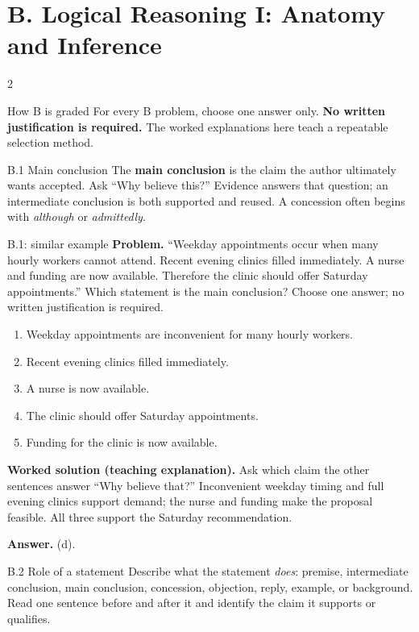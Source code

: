 \documentclass[10pt]{extarticle}
\newcommand{\term}[1]{\textbf{\color{ArgNavy}#1}}
\begin{document}
\section*{B. Logical Reasoning I: Anatomy and Inference}
\begin{multicols}{2}
\begin{definitionbox}{How B is graded}
For every B problem, choose one answer only. \textbf{No written justification is
required.} The worked explanations here teach a repeatable selection method.
\end{definitionbox}

\begin{methodbox}{B.1 Main conclusion}
The \term{main conclusion} is the claim the author ultimately wants accepted.
Ask ``Why believe this?'' Evidence answers that question; an intermediate
conclusion is both supported and reused. A concession often begins with
\emph{although} or \emph{admittedly}.
\end{methodbox}

\begin{workedbox}{B.1: similar example}
\textbf{Problem.} ``Weekday appointments occur when many hourly workers cannot attend. Recent evening clinics filled immediately. A nurse and funding are now available. Therefore the clinic should offer Saturday appointments.'' Which statement is the main conclusion? Choose one answer; no written justification is required.

\begin{enumerate}[label=(\alph*)]
\item Weekday appointments are inconvenient for many hourly workers.
\item Recent evening clinics filled immediately.
\item A nurse is now available.
\item The clinic should offer Saturday appointments.
\item Funding for the clinic is now available.
\end{enumerate}
\textbf{Worked solution (teaching explanation).} Ask which claim the other sentences answer ``Why believe that?'' Inconvenient weekday timing and full evening clinics support demand; the nurse and funding make the proposal feasible. All three support the Saturday recommendation.

\textbf{Answer.} (d).
\end{workedbox}

\begin{methodbox}{B.2 Role of a statement}
Describe what the statement \emph{does}: premise, intermediate conclusion,
main conclusion, concession, objection, reply, example, or background. Read one
sentence before and after it and identify the claim it supports or qualifies.
\end{methodbox}


\end{multicols}
\end{document}
